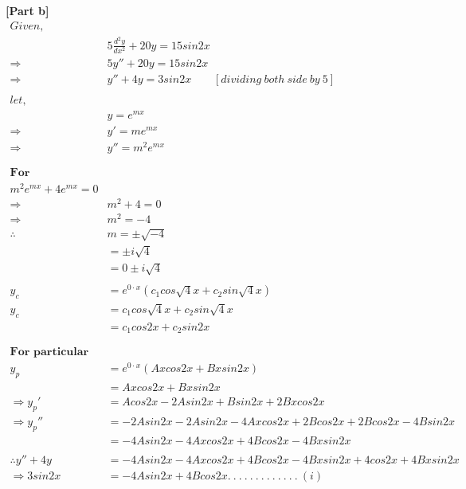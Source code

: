 \documentclass{article}
\begin{document}
\begin{homeworkProblem}
    \textbf{[Part b]}
    \\
    \vspace{5mm}
    \[
    \begin{split}
        Given,
        \\
        & 5 \frac{d^2y}{dx^2} + 20y = 15 sin 2x
        \\
        \Rightarrow & 5{y}'' + 20 y = 15 sin 2x 
        \\
        \Rightarrow & {y}'' + 4y = 3 sin 2x \ \ \ \ \ \ \ \ \ [dividing \  both \ side \ by \ 5]
        \\
        \\
        let,
        \\
        & y = e^{mx}
        \\
        \Rightarrow & y' = m  e^{mx} 
        \\
        \Rightarrow & y'' = m^2  e^{mx}
        \\ \\ \\
        \textbf{For complimentary function:}
        \\
        m^2  e^{mx} + 4  e^{mx} = 0
        \\
        \Rightarrow & m^2 + 4 = 0
        \\
        \Rightarrow & m^2 = -4 
        \\
        \therefore & m = \pm \sqrt{-4}
        \\
        & = \pm i \sqrt{4}
        \\
        & = 0 \pm  i\sqrt{4}
        \\ \\
        y_c &= e^{0 \cdot x} (c_1 cos \sqrt{4}x + c_2 sin \sqrt{4}x)
        \\
        y_c &= c_1 cos \sqrt{4}x + c_2 sin \sqrt{4}x
        \\
        &= c_1 cos 2x + c_2 sin 2x
        \\ \\ \\
        \textbf{For particular solution:}
        \\
        y_p &= e ^{0 \cdot x} (A x cos 2 x + B x sin 2x)
        \\
        &= A x cos 2x + B x sin 2x
        \\
        \Rightarrow {y_p}' &= A cos 2x - 2 A sin 2 x + B sin 2x + 2Bx cos 2x
        \\
        \Rightarrow {y_p}'' &= - 2A sin 2x - 2A sin 2x - 4Ax cos 2x + 2B cos 2x + 2B cos 2x - 4B sin 2 x
        \\
        & = -4A sin 2x - 4 A x cos 2x + 4B cos 2x - 4B x sin 2x
        \\\\
        \therefore y'' + 4y &= -4A sin 2x - 4Ax cos 2x + 4B cos 2x - 4B x sin 2x + 4 cos 2x + 4B x sin 2x 
        \\[5mm]
        \Rightarrow 3 sin 2x &=  -4A sin2x + 4 B cos 2x . \ . \ . \ . \  . \ . \ . \ . \ . \ . \ . \ . \ . \ (i)
    \end{split}
    \]
    \pagebreak
    

\end{homeworkProblem}
\end{document}
